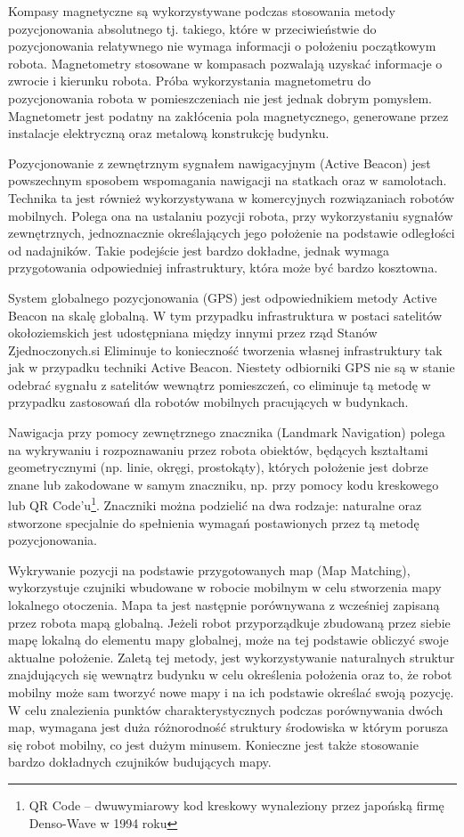 Kompasy magnetyczne są wykorzystywane podczas stosowania metody pozycjonowania absolutnego tj. takiego, które w przeciwieństwie do pozycjonowania relatywnego nie wymaga informacji o położeniu początkowym robota. Magnetometry stosowane w kompasach pozwalają uzyskać informacje o zwrocie i kierunku robota. Próba wykorzystania magnetometru do pozycjonowania robota w pomieszczeniach nie jest jednak dobrym pomysłem. Magnetometr jest podatny na zakłócenia pola magnetycznego, generowane przez instalacje elektryczną oraz metalową konstrukcję budynku.

Pozycjonowanie z zewnętrznym sygnałem nawigacyjnym (Active Beacon) jest powszechnym sposobem wspomagania nawigacji na statkach oraz w samolotach. Technika ta jest również wykorzystywana w komercyjnych rozwiązaniach robotów mobilnych. Polega ona na ustalaniu pozycji robota, przy wykorzystaniu sygnałów zewnętrznych, jednoznacznie określających jego położenie na podstawie odległości od nadajników. Takie podejście jest bardzo dokładne, jednak wymaga przygotowania odpowiedniej infrastruktury, która może być bardzo kosztowna.

System globalnego pozycjonowania (GPS) jest odpowiednikiem metody Active Beacon na skalę globalną. W tym przypadku infrastruktura w postaci satelitów okołoziemskich jest udostępniana między innymi przez rząd Stanów Zjednoczonych.si Eliminuje to konieczność tworzenia własnej infrastruktury tak jak w przypadku techniki Active Beacon. Niestety odbiorniki GPS nie są w stanie odebrać sygnału z satelitów wewnątrz pomieszczeń, co eliminuje tą metodę w przypadku zastosowań dla robotów mobilnych pracujących w budynkach.

Nawigacja przy pomocy zewnętrznego znacznika (Landmark Navigation) polega na wykrywaniu i rozpoznawaniu przez robota obiektów, będących kształtami geometrycznymi (np. linie, okręgi, prostokąty), których położenie jest dobrze znane lub zakodowane w samym znaczniku, np. przy pomocy kodu kreskowego lub QR Code'u\footnote{QR Code -- dwuwymiarowy kod kreskowy wynaleziony przez japońską firmę Denso-Wave w 1994 roku}. Znaczniki można podzielić na dwa rodzaje: naturalne oraz stworzone specjalnie do spełnienia wymagań postawionych przez tą metodę pozycjonowania.

Wykrywanie pozycji na podstawie przygotowanych map (Map Matching), wykorzystuje czujniki wbudowane w robocie mobilnym w celu stworzenia mapy lokalnego otoczenia. Mapa ta jest następnie porównywana z wcześniej zapisaną przez robota mapą globalną. Jeżeli robot przyporządkuje zbudowaną przez siebie mapę lokalną do elementu mapy globalnej, może na tej podstawie obliczyć swoje aktualne położenie. Zaletą tej metody, jest wykorzystywanie naturalnych struktur znajdujących się wewnątrz budynku w celu określenia położenia oraz to, że robot mobilny może sam tworzyć nowe mapy i na ich podstawie określać swoją pozycję. W celu znalezienia punktów charakterystycznych podczas porównywania dwóch map, wymagana jest duża różnorodność struktury środowiska w którym porusza się robot mobilny, co jest dużym minusem. Konieczne jest także stosowanie bardzo dokładnych czujników budujących mapy.

